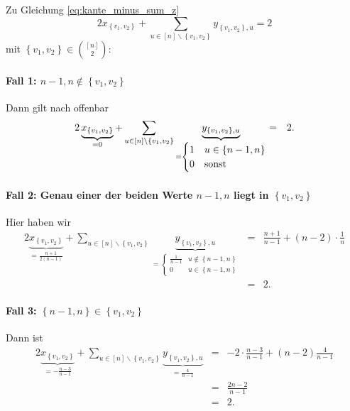 \documentclass[10p,a4paper,BCOR = 12mm, DIV=15]{scrbook}
\begin{document}
{\begin{bew}
Zu Gleichung \eqref{eq:kante_minus_sum_z} 
\begin{displaymath}
2 x_{\left\{v_1, v_2\right\}} + \sum_{u\in[n]\backslash\left\{v_1, v_2\right\}} y_{\left\{v_1, v_2\right\}, u} = 2
\end{displaymath}
mit $\left\{v_1, v_2\right\} \in {\left[n\right] \choose 2}$:

\paragraph{Fall 1: $n-1, n\notin \left\{v_1, v_2\right\}$} Dann gilt nach offenbar
\begin{eqnarray*}
2 \underbrace{x_{\left\{v_1, v_2\right\}}}_{ = 0} + \sum_{u\in[n]\backslash\left\{v_1, v_2\right\}} \underbrace{y_{\left\{v_1, v_2\right\}, u}}_{ = \begin{cases}
1 & u\in \left\{n-1, n\right\} \\
0 & \textnormal{sonst}
\end{cases}} & = & 2.
\end{eqnarray*}

\paragraph{Fall 2: Genau einer der beiden Werte $n-1, n$ liegt in $\left\{v_1, v_2\right\}$} Hier haben wir
\begin{eqnarray*}
2 \underbrace{x_{\left\{v_1, v_2\right\}}}_{= \frac{n+1}{2\left(n-1\right)}} + \sum_{u\in[n]\backslash\left\{v_1, v_2\right\}} \underbrace{y_{\left\{v_1, v_2\right\}, u}}_{ = \begin{cases}
\frac{1}{n-1} & u\notin \left\{n-1, n\right\} \\
0 & u\in \left\{n-1, n\right\}
\end{cases}} & = & \frac{n+1}{n-1} + \left(n-2\right) \cdot \frac{1}{n} \\
& = & 2.
\end{eqnarray*}

\paragraph{Fall 3: $\left\{n-1, n\right\} \in \left\{v_1, v_2\right\}$} Dann ist
\begin{eqnarray*}
2 \underbrace{x_{\left\{v_1, v_2\right\}}}_{= -\frac{n-3}{n-1}} + \sum_{u\in[n]\backslash\left\{v_1, v_2\right\}} \underbrace{y_{\left\{v_1, v_2\right\}, u}}_{= \frac{4}{n-1}}
& = & - 2 \cdot \frac{n-3}{n-1} + \left(n-2\right) \frac{4}{n-1} \\
& = & \frac{2 n-2}{n-1} \\
& = & 2.
\end{eqnarray*}
\end{bew}

}
\end{document}
